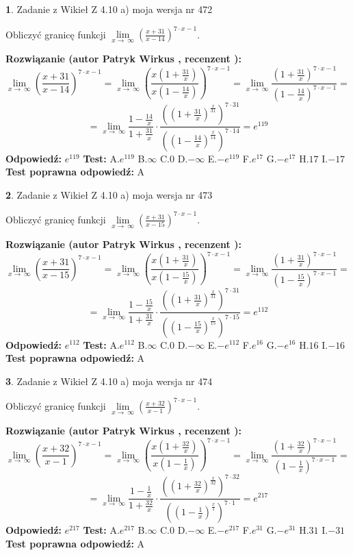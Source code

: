 \documentclass[12pt, a4paper]{article}
\theoremstyle{definition} %
\newtheorem{zad}{}
\newcommand{\zadStart}[1]{\begin{zad}#1\newline}
\newcommand{\zadStop}{\end{zad}}
\newcommand{\rozwStart}[2]{\noindent \textbf{Rozwiązanie (autor #1 , recenzent #2): }\newline}
\newcommand{\rozwStop}{\newline}
\newcommand{\odpStart}{\noindent \textbf{Odpowiedź:}\newline}
\newcommand{\odpStop}{\newline}
\newcommand{\testStart}{\noindent \textbf{Test:}\newline}
\newcommand{\testStop}{\newline}
\newcommand{\kluczStart}{\noindent \textbf{Test poprawna odpowiedź:}\newline}
\newcommand{\kluczStop}{\newline}
\begin{document}
\zadStart{Zadanie z Wikieł Z 4.10 a) moja wersja nr 472}

Obliczyć granicę funkcji  $\lim\limits_{x\to\ \infty}(\frac{x+31}{x-14})^{7\cdot x-1}$.
\zadStop
\rozwStart{Patryk Wirkus}{}
$$\lim\limits_{x\to\ \infty}(\frac{x+31}{x-14})^{7\cdot x-1} = \lim\limits_{x\to\ \infty}(\frac{x(1+\frac{31}{x})}{x(1-\frac{14}{x})})^{7\cdot x-1}=\lim\limits_{x\to\ \infty}\frac{(1+\frac{31}{x})^{7\cdot x-1}}{(1-\frac{14}{x})^{7\cdot x-1}}=$$
$$=\lim\limits_{x\to\ \infty}\frac{1-\frac{14}{x}}{1+\frac{31}{x}}\cdot\frac{((1+\frac{31}{x})^{\frac{x}{31}})^{7\cdot31}}{((1-\frac{14}{x})^{\frac{x}{14}})^{7\cdot14}}=e^{119}$$
\rozwStop
\odpStart
$e^{119}$
\odpStop
\testStart
A.$e^{119}$ B.$\infty$ C.$0$ D.$-\infty$ E.$-e^{119}$
F.$e^{17}$ G.$-e^{17}$
H.$17$
I.$-17$
\testStop
\kluczStart
A
\kluczStop



\zadStart{Zadanie z Wikieł Z 4.10 a) moja wersja nr 473}

Obliczyć granicę funkcji  $\lim\limits_{x\to\ \infty}(\frac{x+31}{x-15})^{7\cdot x-1}$.
\zadStop
\rozwStart{Patryk Wirkus}{}
$$\lim\limits_{x\to\ \infty}(\frac{x+31}{x-15})^{7\cdot x-1} = \lim\limits_{x\to\ \infty}(\frac{x(1+\frac{31}{x})}{x(1-\frac{15}{x})})^{7\cdot x-1}=\lim\limits_{x\to\ \infty}\frac{(1+\frac{31}{x})^{7\cdot x-1}}{(1-\frac{15}{x})^{7\cdot x-1}}=$$
$$=\lim\limits_{x\to\ \infty}\frac{1-\frac{15}{x}}{1+\frac{31}{x}}\cdot\frac{((1+\frac{31}{x})^{\frac{x}{31}})^{7\cdot31}}{((1-\frac{15}{x})^{\frac{x}{15}})^{7\cdot15}}=e^{112}$$
\rozwStop
\odpStart
$e^{112}$
\odpStop
\testStart
A.$e^{112}$ B.$\infty$ C.$0$ D.$-\infty$ E.$-e^{112}$
F.$e^{16}$ G.$-e^{16}$
H.$16$
I.$-16$
\testStop
\kluczStart
A
\kluczStop



\zadStart{Zadanie z Wikieł Z 4.10 a) moja wersja nr 474}

Obliczyć granicę funkcji  $\lim\limits_{x\to\ \infty}(\frac{x+32}{x-1})^{7\cdot x-1}$.
\zadStop
\rozwStart{Patryk Wirkus}{}
$$\lim\limits_{x\to\ \infty}(\frac{x+32}{x-1})^{7\cdot x-1} = \lim\limits_{x\to\ \infty}(\frac{x(1+\frac{32}{x})}{x(1-\frac{1}{x})})^{7\cdot x-1}=\lim\limits_{x\to\ \infty}\frac{(1+\frac{32}{x})^{7\cdot x-1}}{(1-\frac{1}{x})^{7\cdot x-1}}=$$
$$=\lim\limits_{x\to\ \infty}\frac{1-\frac{1}{x}}{1+\frac{32}{x}}\cdot\frac{((1+\frac{32}{x})^{\frac{x}{32}})^{7\cdot32}}{((1-\frac{1}{x})^{\frac{x}{1}})^{7\cdot1}}=e^{217}$$
\rozwStop
\odpStart
$e^{217}$
\odpStop
\testStart
A.$e^{217}$ B.$\infty$ C.$0$ D.$-\infty$ E.$-e^{217}$
F.$e^{31}$ G.$-e^{31}$
H.$31$
I.$-31$
\testStop
\kluczStart
A
\kluczStop
\end{document}
